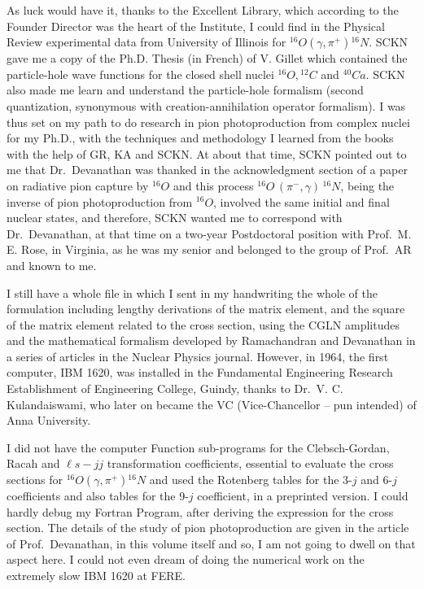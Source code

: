 As luck would have it, thanks to the Excellent Library, which according to the Founder Director was the heart of the Institute, I could find in the Physical Review experimental data from University of Illinois for ${}^{16}O(\gamma, \pi^+){}^{16}N$. SCKN gave me a copy of the Ph.D. Thesis (in French) of V. Gillet which contained the particle-hole wave functions for the closed shell nuclei ${}^{16}O, {}^{12}C$ and ${}^{40}Ca$. SCKN also made me learn and understand the particle-hole formalism (second quantization, synonymous with creation-annihilation operator formalism). I was thus set on my path to do research in pion photoproduction from complex nuclei for my Ph.D., with the techniques and methodology I learned from the books with the help of GR, KA and SCKN. At about that time, SCKN pointed out to me that Dr.\ Devanathan was thanked in the acknowledgment section of a paper on radiative pion capture by $^{16}O$ and this process ${}^{16}O\,(\pi^- ,\gamma)\,{}^{16}N$, being the inverse of pion photoproduction from $^{16}O$, involved the same initial and final nuclear states, and therefore, SCKN wanted me to correspond with Dr.\ Devanathan, at that time on a two-year Postdoctoral position with Prof.\ M. E. Rose, in Virginia, as he was my senior and belonged to the group of Prof.\ AR and known to me.

I still have a whole file in which I sent in my handwriting the whole of the formulation including lengthy derivations of the matrix element, and the square of the matrix element related to the cross section, using the CGLN amplitudes and the mathematical formalism developed by Ramachandran and Devanathan in a series of articles in the Nuclear Physics journal. However, in 1964, the first computer, IBM 1620, was installed in the Fundamental Engineering Research Establishment of Engineering College, Guindy, thanks to Dr.\ V. C. Kulandaiswami, who later on became the VC (Vice-Chancellor -- pun intended) of Anna University.

I did not have the computer Function sub-programs for the Clebsch-Gordan, Racah and $\ell s-jj$ transformation coefficients, essential to evaluate the cross sections for ${}^{16}O(\gamma, \pi^+){}^{16}N$ and used the Rotenberg tables for the 3-$j$ and 6-$j$ coefficients and also tables for the 9-$j$ coefficient, in a preprinted version. I could hardly debug my Fortran Program, after deriving the expression for the cross section. The details of the study of pion photoproduction are given in the article of Prof.\ Devanathan, in this volume itself and so, I am not going to dwell on that aspect here. I could not even dream of doing the numerical work on the extremely slow IBM 1620 at FERE.

